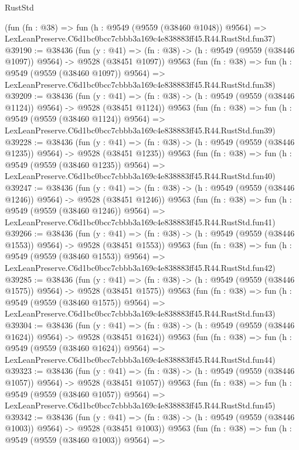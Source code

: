 \begin{lexlean}{RustStd}
\begin{coremodule}
    (fun (fn : @38) =>
    fun (h : @9549 (@9559 (@38460 @1048)) @9564) =>
    LexLeanPreserve.C6d1bc0bcc7cbbb3a169c4e838883ff45.R44.RustStd.fun37)
@39190 := @38436
    (fun (y : @41) =>
    (fn : @38) -> (h : @9549 (@9559 (@38446 @1097)) @9564) -> @9528 (@38451 @1097))
    @9563
    (fun (fn : @38) =>
    fun (h : @9549 (@9559 (@38460 @1097)) @9564) =>
    LexLeanPreserve.C6d1bc0bcc7cbbb3a169c4e838883ff45.R44.RustStd.fun38)
@39209 := @38436
    (fun (y : @41) =>
    (fn : @38) -> (h : @9549 (@9559 (@38446 @1124)) @9564) -> @9528 (@38451 @1124))
    @9563
    (fun (fn : @38) =>
    fun (h : @9549 (@9559 (@38460 @1124)) @9564) =>
    LexLeanPreserve.C6d1bc0bcc7cbbb3a169c4e838883ff45.R44.RustStd.fun39)
@39228 := @38436
    (fun (y : @41) =>
    (fn : @38) -> (h : @9549 (@9559 (@38446 @1235)) @9564) -> @9528 (@38451 @1235))
    @9563
    (fun (fn : @38) =>
    fun (h : @9549 (@9559 (@38460 @1235)) @9564) =>
    LexLeanPreserve.C6d1bc0bcc7cbbb3a169c4e838883ff45.R44.RustStd.fun40)
@39247 := @38436
    (fun (y : @41) =>
    (fn : @38) -> (h : @9549 (@9559 (@38446 @1246)) @9564) -> @9528 (@38451 @1246))
    @9563
    (fun (fn : @38) =>
    fun (h : @9549 (@9559 (@38460 @1246)) @9564) =>
    LexLeanPreserve.C6d1bc0bcc7cbbb3a169c4e838883ff45.R44.RustStd.fun41)
@39266 := @38436
    (fun (y : @41) =>
    (fn : @38) -> (h : @9549 (@9559 (@38446 @1553)) @9564) -> @9528 (@38451 @1553))
    @9563
    (fun (fn : @38) =>
    fun (h : @9549 (@9559 (@38460 @1553)) @9564) =>
    LexLeanPreserve.C6d1bc0bcc7cbbb3a169c4e838883ff45.R44.RustStd.fun42)
@39285 := @38436
    (fun (y : @41) =>
    (fn : @38) -> (h : @9549 (@9559 (@38446 @1575)) @9564) -> @9528 (@38451 @1575))
    @9563
    (fun (fn : @38) =>
    fun (h : @9549 (@9559 (@38460 @1575)) @9564) =>
    LexLeanPreserve.C6d1bc0bcc7cbbb3a169c4e838883ff45.R44.RustStd.fun43)
@39304 := @38436
    (fun (y : @41) =>
    (fn : @38) -> (h : @9549 (@9559 (@38446 @1624)) @9564) -> @9528 (@38451 @1624))
    @9563
    (fun (fn : @38) =>
    fun (h : @9549 (@9559 (@38460 @1624)) @9564) =>
    LexLeanPreserve.C6d1bc0bcc7cbbb3a169c4e838883ff45.R44.RustStd.fun44)
@39323 := @38436
    (fun (y : @41) =>
    (fn : @38) -> (h : @9549 (@9559 (@38446 @1057)) @9564) -> @9528 (@38451 @1057))
    @9563
    (fun (fn : @38) =>
    fun (h : @9549 (@9559 (@38460 @1057)) @9564) =>
    LexLeanPreserve.C6d1bc0bcc7cbbb3a169c4e838883ff45.R44.RustStd.fun45)
@39342 := @38436
    (fun (y : @41) =>
    (fn : @38) -> (h : @9549 (@9559 (@38446 @1003)) @9564) -> @9528 (@38451 @1003))
    @9563
    (fun (fn : @38) =>
    fun (h : @9549 (@9559 (@38460 @1003)) @9564) =>

\end{coremodule}
\end{lexlean}

